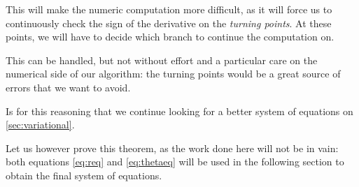 This will make the numeric computation more difficult, as it will force us to continuously check the sign of the derivative on the \emph{turning points}. At these points, we will have to decide which branch to continue the computation on.

This can be handled, but not without effort and a particular care on the numerical side of our algorithm: the turning points would be a great source of errors that we want to avoid.

Is for this reasoning that we continue looking for a better system of equations on \autoref{sec:variational}.

Let us however prove this theorem, as the work done here will not be in vain: both equations \ref{eq:req} and \ref{eq:thetaeq} will be used in the following section to obtain the final system of equations.

